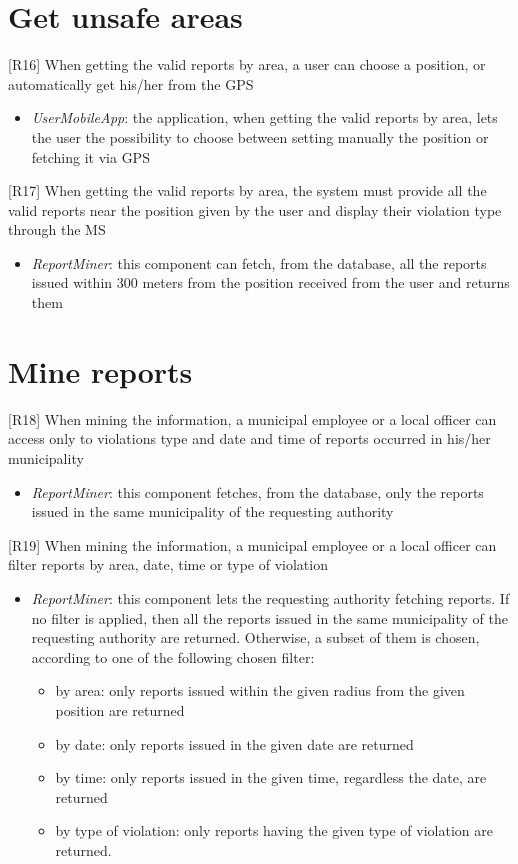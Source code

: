 		\section{Get unsafe areas}
			{[R16]} When getting the valid reports by area, a user can choose a position, or automatically get his/her from the GPS
					\begin{itemize}
						\item \textit{UserMobileApp}: the application, when getting the valid reports by area, lets the user the possibility to choose between setting manually the position or fetching it via GPS
					\end{itemize}
			{[R17]} When getting the valid reports by area, the system must provide all the valid reports near the position given by the user and display their violation type through the MS
					\begin{itemize}
						\item \textit{ReportMiner}: this component can fetch, from the database, all the reports issued within 300 meters from the position received from the user and returns them
					\end{itemize}
		\section{Mine reports}
			{[R18]} When mining the information, a municipal employee or a local officer can access only to violations type and date and time of reports occurred in his/her municipality
				\begin{itemize}
						\item \textit{ReportMiner}: this component fetches, from the database, only the reports issued in the same municipality of the requesting authority
					\end{itemize}
			{[R19]} When mining the information, a municipal employee or a local officer can filter reports by area, date, time or type of violation
					\begin{itemize}
						\item \textit{ReportMiner}: this component lets the requesting authority fetching reports. If no filter is applied, then all the reports issued in the same municipality of the requesting authority are returned. Otherwise, a subset of them is chosen, according to one of the following chosen filter:
							\begin{itemize}
								\item by area: only reports issued within the given radius from the given position are returned
								\item by date: only reports issued in the given date are returned
								\item by time: only reports issued in the given time, regardless the date, are returned
								\item by type of violation: only reports having the given type of violation are returned.
							\end{itemize}
					\end{itemize}

